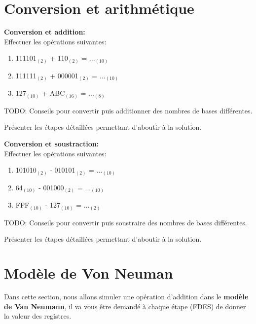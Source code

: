 \section{Conversion et arithmétique}
\begin{Exercice}[20 minutes] \textbf{Conversion et addition:}\\
    Effectuer les opérations suivantes:
    \begin{enumerate}
        \item 111101$_{(2)}$ + 110$_{(2)}$ = ...$_{(10)}$
        \item 111111$_{(2)}$ + 000001$_{(2)}$ = ...$_{(10)}$
        \item 127$_{(10)}$ + ABC$_{(16)}$ = ...$_{(8)}$
    \end{enumerate}
    \begin{conseil}
        TODO: Conseils pour convertir puis additionner des nombres de bases différentes.
    \end{conseil}
    \begin{solution}
        Présenter les étapes détaillées permettant d'aboutir à la solution.
    \end{solution}
\end{Exercice}

\begin{Exercice}[20 minutes] \textbf{Conversion et soustraction:}\\
    Effectuer les opérations suivantes:
    \begin{enumerate}
        \item 101010$_{(2)}$ - 010101$_{(2)}$ = ...$_{(10)}$
        \item 64$_{(10)}$ - 001000$_{(2)}$ = ...$_{(10)}$
        \item FFF$_{(10)}$ - 127$_{(10)}$ = ...$_{(2)}$
    \end{enumerate}
    \begin{conseil}
        TODO: Conseils pour convertir puis soustraire des nombres de bases différentes.
    \end{conseil}
    \begin{solution}
        Présenter les étapes détaillées permettant d'aboutir à la solution.
    \end{solution}
\end{Exercice}


\newpage
\section{Modèle de Von Neuman}
Dans cette section, nous allons simuler une opération d'addition dans le \textbf{modèle de Van Neumann}, il va vous être demandé à chaque étape (FDES) de donner la valeur des registres.\\

